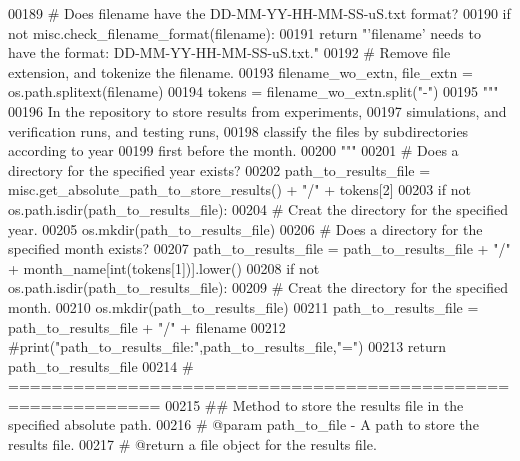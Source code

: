 \begin{DoxyCode}
00189         \textcolor{comment}{# Does filename have the DD-MM-YY-HH-MM-SS-uS.txt format?}
00190         \textcolor{keywordflow}{if} \textcolor{keywordflow}{not} misc.check\_filename\_format(filename):
00191             \textcolor{keywordflow}{return} \textcolor{stringliteral}{"'filename' needs to have the format: DD-MM-YY-HH-MM-SS-uS.txt."}
00192         \textcolor{comment}{# Remove file extension, and tokenize the filename.}
00193         filename\_wo\_extn, file\_extn = os.path.splitext(filename)
00194         tokens = filename\_wo\_extn.split(\textcolor{stringliteral}{"-"})
00195         \textcolor{stringliteral}{"""}
00196 \textcolor{stringliteral}{            In the repository to store results from experiments,}
00197 \textcolor{stringliteral}{                simulations, and verification runs, and testing runs,}
00198 \textcolor{stringliteral}{                classify the files by subdirectories according to year}
00199 \textcolor{stringliteral}{                first before the month.}
00200 \textcolor{stringliteral}{        """}
00201         \textcolor{comment}{# Does a directory for the specified year exists?}
00202         path\_to\_results\_file = misc.get\_absolute\_path\_to\_store\_results() +  \textcolor{stringliteral}{"/"} + tokens[2]
00203         \textcolor{keywordflow}{if} \textcolor{keywordflow}{not} os.path.isdir(path\_to\_results\_file):
00204             \textcolor{comment}{# Creat the directory for the specified year.}
00205             os.mkdir(path\_to\_results\_file)
00206         \textcolor{comment}{# Does a directory for the specified month exists?}
00207         path\_to\_results\_file = path\_to\_results\_file + \textcolor{stringliteral}{"/"} + month\_name[int(tokens[1])].lower()
00208         \textcolor{keywordflow}{if} \textcolor{keywordflow}{not} os.path.isdir(path\_to\_results\_file):
00209             \textcolor{comment}{# Creat the directory for the specified month.}
00210             os.mkdir(path\_to\_results\_file)
00211         path\_to\_results\_file = path\_to\_results\_file + \textcolor{stringliteral}{"/"} + filename
00212         \textcolor{comment}{#print("path\_to\_results\_file:",path\_to\_results\_file,"=")}
00213         \textcolor{keywordflow}{return} path\_to\_results\_file
00214     \textcolor{comment}{# ============================================================}
00215     \textcolor{comment}{##  Method to store the results file in the specified absolute path.}
00216     \textcolor{comment}{#   @param path\_to\_file - A path to store the results file.}
00217     \textcolor{comment}{#   @return a file object for the results file.}

\end{DoxyCode}
